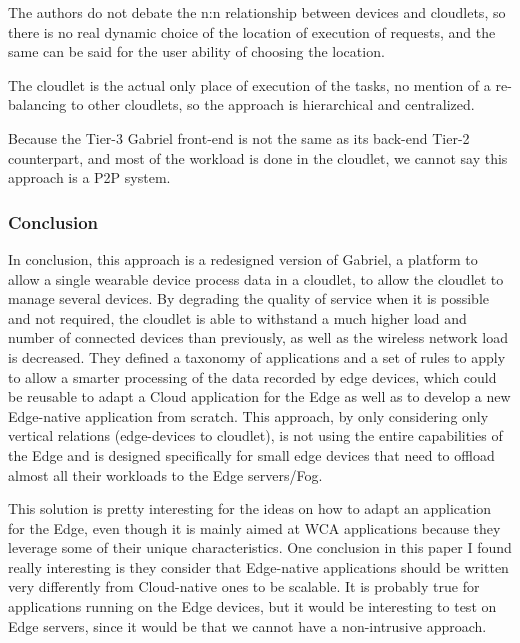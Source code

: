 The authors do not debate the n:n relationship between devices and
cloudlets, so there is no real dynamic choice of the location of
execution of requests, and the same can be said for the user ability
of choosing the location.


The cloudlet is the actual only place of execution of the tasks, no
mention of a re-balancing to other cloudlets, so the approach is
hierarchical and centralized.

Because the Tier-3 Gabriel front-end is not the same as its back-end
Tier-2 counterpart, and most of the workload is done in the cloudlet,
we cannot say this approach is a \acrshort{P2P} system.

\subsubsection*{Conclusion}

In conclusion, this approach is a redesigned version of Gabriel, a
platform to allow a single wearable device process data in a cloudlet,
to allow the cloudlet to manage several devices.
%
By degrading the quality of service when it is possible and not
required, the cloudlet is able to withstand a much higher load and
number of connected devices than previously, as well as the wireless
network load is decreased.
%
They defined a taxonomy of applications and a set of rules to apply to
allow a smarter processing of the data recorded by edge devices, which
could be reusable to adapt a Cloud application for the Edge as well as
to develop a new Edge-native application from scratch.
%
This approach, by only considering only vertical relations
(edge-devices to cloudlet), is not using the entire capabilities of
the Edge and is designed specifically for small edge devices that need
to offload almost all their workloads to the Edge servers/Fog.

This solution is pretty interesting for the ideas on how to adapt an
application for the Edge, even though it is mainly aimed at WCA
applications because they leverage some of their unique
characteristics.
%
One conclusion in this paper I found really interesting is they
consider that Edge-native applications should be written very
differently from Cloud-native ones to be scalable.
%
It is probably true for applications running on the Edge devices, but
it would be interesting to test on Edge servers, since it would be
that we cannot have a non-intrusive approach.


